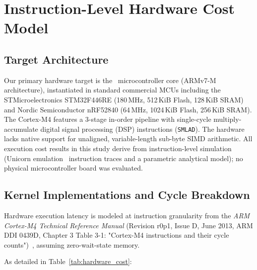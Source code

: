 \documentclass{ieeeaccess}
\begin{document}
\section{Instruction-Level Hardware Cost Model}
\label{sec:hardware}

\subsection{Target Architecture}
Our primary hardware target is the \MacroTargetArch\ microcontroller core (ARMv7-M architecture), instantiated in standard commercial MCUs including the STMicroelectronics STM32F446RE (180\,MHz, 512\,KiB Flash, 128\,KiB SRAM) and Nordic Semiconductor nRF52840 (64\,MHz, 1024\,KiB Flash, 256\,KiB SRAM). The Cortex-M4 features a 3-stage in-order pipeline with single-cycle multiply-accumulate digital signal processing (DSP) instructions (\texttt{SMLAD}). The hardware lacks native support for unaligned, variable-length sub-byte SIMD arithmetic. All execution cost results in this study derive from instruction-level simulation (Unicorn emulation~\cite{quynh2015unicorn} instruction traces and a parametric analytical model); no physical microcontroller board was evaluated.

\subsection{Kernel Implementations and Cycle Breakdown}
Hardware execution latency is modeled at instruction granularity from the \textit{ARM Cortex-M4 Technical Reference Manual} (Revision r0p1, Issue D, June 2013, ARM DDI 0439D, Chapter 3 Table 3-1: "Cortex-M4 instructions and their cycle counts")~\cite{arm2020cortexm4}, assuming zero-wait-state memory.

As detailed in Table~\ref{tab:hardware_cost}:

\end{document}
